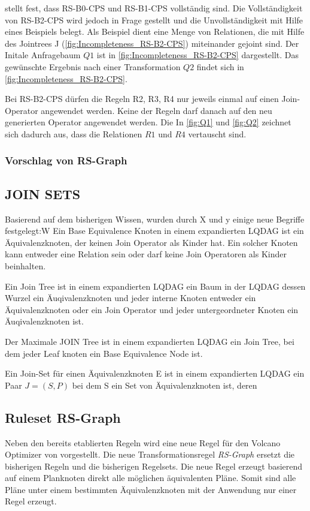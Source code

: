 \cite{shanbhag2014optimizing} stellt fest, dass RS-B0-CPS und RS-B1-CPS vollständig sind. Die Vollständigkeit von RS-B2-CPS wird jedoch in Frage gestellt und die Unvollständigkeit mit Hilfe eines Beispiels belegt. Als Beispiel dient eine Menge von Relationen, die mit Hilfe des Jointrees J (\ref{fig:Incompleteness_RS-B2-CPS}) miteinander gejoint sind. Der Initale Anfragebaum $Q1$ ist in \ref{fig:Incompleteness_RS-B2-CPS} dargestellt. Das gewünschte Ergebnis nach einer Transformation $Q2$  findet sich in \ref{fig:Incompleteness_RS-B2-CPS}. 

Bei RS-B2-CPS dürfen die Regeln R2, R3, R4 nur jeweils einmal auf einen Join-Operator angewendet werden. Keine der Regeln darf danach auf den neu generierten Operator angewendet werden. Die In \ref{fig:Q1} und \ref{fig:Q2} zeichnet sich dadurch aus, dass die Relationen $R1$ und $R4$ vertauscht sind.







\subsubsection{Vorschlag von RS-Graph}

\subsection{JOIN SETS}

Basierend auf dem bisherigen Wissen, wurden durch X und y einige neue Begriffe festgelegt:W
Ein Base Equivalence Knoten in einem expandierten LQDAG ist ein Äquivalenzknoten, der keinen Join Operator als Kinder hat. Ein solcher Knoten kann entweder eine Relation sein oder darf keine Join Operatoren als Kinder beinhalten.

Ein Join Tree ist in einem expandierten LQDAG ein Baum in der LQDAG dessen Wurzel ein Äuqivalenzknoten und jeder interne Knoten entweder ein Äquivalenzknoten oder ein Join Operator und jeder untergeordneter Knoten ein Äuqivalenzknoten ist.

Der Maximale JOIN Tree ist in einem expandierten LQDAG ein Join Tree, bei dem jeder Leaf knoten ein Base Equivalence Node ist.

Ein Join-Set für einen Äquivalenzknoten E ist in einem expandierten LQDAG ein Paar $J = (S, P)$ bei dem S ein Set von Äquivalenzknoten ist, deren 

\subsection{Ruleset RS-Graph}
Neben den bereits etablierten Regeln wird eine neue Regel für den Volcano Optimizer von \cite{shanbhag2014optimizing} vorgestellt. Die neue Transformationsregel \emph{RS-Graph} ersetzt die bisherigen Regeln und die bisherigen Regelsets. Die neue Regel erzeugt basierend auf einem Planknoten direkt alle möglichen äquivalenten Pläne. Somit sind alle Pläne unter einem bestimmten Äquivalenzknoten mit der Anwendung nur einer Regel erzeugt.

